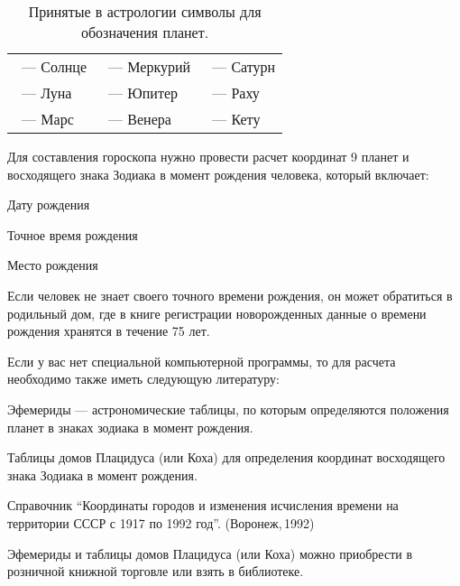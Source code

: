 \begin{table}[tph!]
	\caption{Принятые в астрологии символы для обозначения планет.}
	\label{tbl:planets}

	\centering

	\renewcommand{\arraystretch}{2}

	\setlength{\tabcolsep}{.05\textwidth}

	\begin{tabular}{lll}
		\astrosun\ --- Солнце & \mercury\ --- Меркурий & \saturn\ --- Сатурн \\
		\fullmoon\ --- Луна   & \jupiter\ --- Юпитер   & \ascnode\ --- Раху \\
		\mars\ --- Марс       & \venus\ --- Венера     & \descnode\ --- Кету
	\end{tabular}
\end{table}

Для составления гороскопа нужно провести расчет координат 9 планет и восходящего знака Зодиака в момент рождения человека, который включает:
\begin{myitem}
	\item Дату рождения
	\item Точное время рождения
	\item Место рождения
\end{myitem}

Если человек не знает своего точного времени рождения, он может обратиться в родильный дом, где в книге регистрации новорожденных данные о времени рождения хранятся в течение 75 лет.

Если у вас нет специальной компьютерной программы, то для расчета необходимо также иметь следующую литературу:
\begin{myenum}
	\item Эфемериды --- астрономические таблицы, по которым определяются положения планет в знаках зодиака в момент рождения.
	\item Таблицы домов Плацидуса (или Коха) для определения координат восходящего знака Зодиака в момент рождения.
	\item Справочник ``Координаты городов и изменения исчисления времени на территории СССР с 1917 по 1992 год''. (Воронеж,\,1992)
\end{myenum}

Эфемериды и таблицы домов Плацидуса (или Коха) можно приобрести в розничной книжной торговле или взять в библиотеке.




